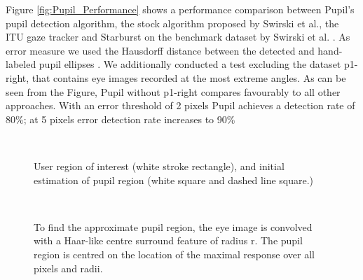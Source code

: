 Figure \ref{fig:Pupil_Performance} shows a performance comparison between Pupil’s pupil detection algorithm, the stock algorithm proposed by Swirski et al., the ITU gaze tracker and Starburst on the benchmark dataset by Swirski et al. \cite{swirski}. As error measure we used the Hausdorff distance between the detected and hand-labeled pupil ellipses \cite{swirski}. We additionally conducted a test excluding the dataset p1-right, that contains eye images recorded at the most extreme angles.
As can be seen from the Figure, Pupil without p1-right compares favourably to all other approaches. With an error threshold of 2 pixels Pupil achieves a detection rate of 80\%; at 5 pixels error detection rate increases to 90\% \cite{pupil}


\begin{figure}[]
\begin{dBox}
\centering
  \mbox{
   }
   \caption{ User region of interest (white stroke rectangle), and initial estimation of pupil region (white square and dashed line square.)\cite{pupil}
 \label{fig:Pupil Region} }   
\end{dBox}   
\end{figure}


\begin{figure}[]
\begin{dBox}
\centering
  \mbox{
   }
   \caption{ To find the approximate pupil region, the eye image is convolved with a Haar-like centre surround feature of radius r. The pupil region is centred on the location of the maximal response over all pixels and radii. \cite{pupil}
 \label{fig:EstimationPupilFig} }   
\end{dBox}   
\end{figure}


